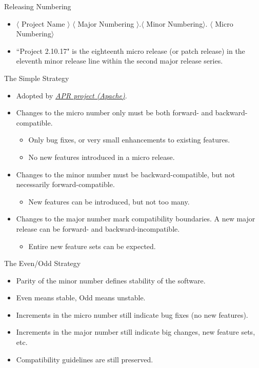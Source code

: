 \documentclass{beamer}
\begin{document}
\begin{frame}{Releasing Numbering}
\begin{itemize}
	\item $\langle$ Project Name $\rangle$ $\langle$ Major Numbering $\rangle$.$\langle$ Minor Numbering$\rangle$. $\langle$ Micro Numbering$\rangle$ 
	\item ``Project 2.10.17" is the eighteenth micro release (or patch release) in the eleventh minor release line within the second major release series. 
\end{itemize}
\end{frame}

\begin{frame}{The Simple Strategy}
\begin{itemize}
	\item Adopted by \emph{\href{http://apr.apache.org/versioning.html}{APR project (Apache)}}. 
	\item Changes to the micro number only must be both forward- and backward-compatible. 
	\begin{itemize}
		\item Only bug fixes, or very small enhancements to existing features.
		\item No new features introduced in a micro release.
	\end{itemize}
	\item Changes to the minor number must be backward-compatible, but not necessarily forward-compatible. 
	\begin{itemize}
		\item New features can be introduced, but not too many.
	\end{itemize}
	\item Changes to the major number mark compatibility boundaries. A new major release can be forward- and backward-incompatible. 
	\begin{itemize}
		\item Entire new feature sets can be expected.
	\end{itemize}
\end{itemize}
\end{frame}

\begin{frame}{The Even/Odd Strategy}
\begin{itemize}
	\item Parity of the minor number defines stability of the software. 
	\item Even means stable, Odd means unstable. 
	\item Increments in the micro number still indicate bug fixes (no new features).  
	\item Increments in the major number still indicate big changes, new feature sets, etc. 
	\item Compatibility guidelines are still preserved.
\end{itemize}
\end{frame}
\end{document}

